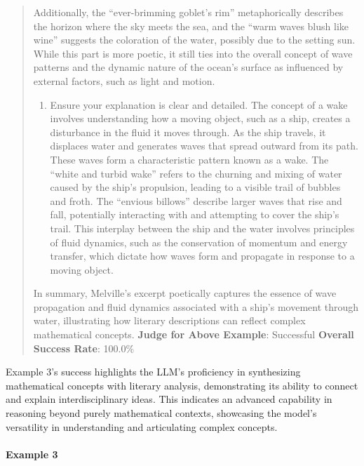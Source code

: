 \documentclass[fleqn,10pt]{wlscirep}
\providecommand{\tightlist}{%
  \setlength{\itemsep}{0pt}\setlength{\parskip}{0pt}}
\begin{document}
\begin{quote}
Additionally, the ``ever-brimming goblet's rim'' metaphorically
describes the horizon where the sky meets the sea, and the ``warm waves
blush like wine'' suggests the coloration of the water, possibly due to
the setting sun. While this part is more poetic, it still ties into the
overall concept of wave patterns and the dynamic nature of the ocean's
surface as influenced by external factors, such as light and motion.

\begin{enumerate}
\def\labelenumi{\arabic{enumi}.}
\setcounter{enumi}{2}
\tightlist
\item
  Ensure your explanation is clear and detailed. The concept of a wake
  involves understanding how a moving object, such as a ship, creates a
  disturbance in the fluid it moves through. As the ship travels, it
  displaces water and generates waves that spread outward from its path.
  These waves form a characteristic pattern known as a wake. The ``white
  and turbid wake'' refers to the churning and mixing of water caused by
  the ship's propulsion, leading to a visible trail of bubbles and
  froth. The ``envious billows'' describe larger waves that rise and
  fall, potentially interacting with and attempting to cover the ship's
  trail. This interplay between the ship and the water involves
  principles of fluid dynamics, such as the conservation of momentum and
  energy transfer, which dictate how waves form and propagate in
  response to a moving object.
\end{enumerate}

In summary, Melville's excerpt poetically captures the essence of wave
propagation and fluid dynamics associated with a ship's movement through
water, illustrating how literary descriptions can reflect complex
mathematical concepts. \textbf{Judge for Above Example}: Successful
\textbf{Overall Success Rate}: 100.0\%
\end{quote}

Example 3's success highlights the LLM's proficiency in synthesizing
mathematical concepts with literary analysis, demonstrating its ability
to connect and explain interdisciplinary ideas. This indicates an
advanced capability in reasoning beyond purely mathematical contexts,
showcasing the model's versatility in understanding and articulating
complex concepts.

\hypertarget{example-3-9}{%
\paragraph{Example 3}\label{example-3-9}}
\end{document}
